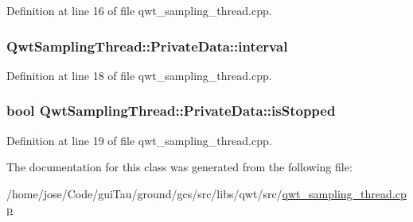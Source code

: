 Definition at line 16 of file qwt\-\_\-sampling\-\_\-thread.\-cpp.

\hypertarget{class_qwt_sampling_thread_1_1_private_data_ad483727409f9d72022e89fdbab47c0b5}{
\subsubsection[{interval}]{ Qwt\-Sampling\-Thread\-::\-Private\-Data\-::interval}}\label{class_qwt_sampling_thread_1_1_private_data_ad483727409f9d72022e89fdbab47c0b5}


Definition at line 18 of file qwt\-\_\-sampling\-\_\-thread.\-cpp.

\hypertarget{class_qwt_sampling_thread_1_1_private_data_ab2452489acbea2a570fcdbb73c867f1f}{
\subsubsection[{is\-Stopped}]{\setlength{\rightskip}{0pt plus 5cm}bool Qwt\-Sampling\-Thread\-::\-Private\-Data\-::is\-Stopped}}\label{class_qwt_sampling_thread_1_1_private_data_ab2452489acbea2a570fcdbb73c867f1f}


Definition at line 19 of file qwt\-\_\-sampling\-\_\-thread.\-cpp.



The documentation for this class was generated from the following file\-:\begin{DoxyCompactItemize}
\item 
/home/jose/\-Code/gui\-Tau/ground/gcs/src/libs/qwt/src/\hyperlink{qwt__sampling__thread_8cpp}{qwt\-\_\-sampling\-\_\-thread.\-cpp}\end{DoxyCompactItemize}
